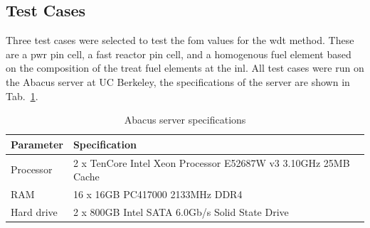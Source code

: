 \subsection{Test Cases}
\label{sec:test_cases}

Three test cases were selected to test the \gls{fom} values for the
\gls{wdt} method. These are a \gls{pwr} pin cell, a fast reactor pin
cell, and a homogenous fuel element based on the composition of the
\gls{treat} fuel elements at the \gls{inl}. All test cases were run on
the Abacus server at UC Berkeley, the specifications of the server are
shown in Tab.~\ref{tab:abacus}.
\begin{table}[hbtp]
  \centering
  \caption{Abacus server specifications}
  \begin{tabular}{ll}
    \toprule
    \textrm{Parameter} & \textrm{Specification} \\ \midrule
    Processor & 2 x TenCore Intel Xeon Processor E5­2687W v3 3.10GHz
                 25MB Cache \\
    RAM & 16 x 16GB PC4­17000 2133MHz DDR4 \\
    Hard drive & 2 x 800GB Intel SATA 6.0Gb/s Solid State Drive
          \\ \bottomrule
  \end{tabular}
  \label{tab:abacus}
\end{table}

